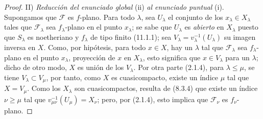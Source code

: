 \begin{proof}
\medskip
\noindent II) \emph{Reducción del enunciado global} (ii) \emph{al enunciado
puntual} (i). Supongamos que $\mathcal F$ es $f$-plano. Para todo $\lambda$,
sea $U_\lambda$ el conjunto de los $x_\lambda\in X_\lambda$ tales que
$\mathcal F_\lambda$ sea $f_\lambda$-plano en el punto $x_\lambda$; se sabe
que $U_\lambda$ es \emph{abierto} en $X_\lambda$ puesto que $S_\lambda$ es
noetheriano y $f_\lambda$ de tipo finito (11.1.1); sea
$V_\lambda=v_\lambda^{-1}(U_\lambda)$ su imagen inversa en $X$. Como,
por hipótesis, para todo $x\in X$, hay un $\lambda$ tal que
$\mathcal F_\lambda$ sea $f_\lambda$-plano en el punto $x_\lambda$, proyección
de $x$ en $X_\lambda$, esto significa que $x\in V_\lambda$ para un
$\lambda$; dicho de otro modo, $X$ es unión de los $V_\lambda$. Por otra parte
(2.1.4), para $\lambda\leq\mu$, se tiene $V_\lambda\subset V_\mu$, por tanto, como
$X$ es cuasicompacto, existe un índice $\mu$ tal que $X=V_\mu$. Como
los $X_\lambda$ son cuasicompactos, resulta de (8.3.4) que existe un
índice $\nu\geq\mu$ tal que $v_{\mu\nu}^{-1}(U_\mu)=X_\nu$; pero, por
(2.1.4), esto implica que $\mathcal F_\nu$ es $f_\nu$-plano.


\end{proof}
